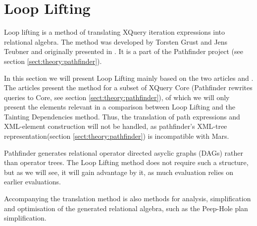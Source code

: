 \section{Loop Lifting}
\label{sect:trans:loop_lifting}
\label{sect:theory:loop_lifting}
Loop lifting is a method of translating XQuery iteration expressions into relational algebra. The method was
developed by Torsten Grust and Jens Teubner and originally presented in \cite{pathfinder_mothertongue}. It is a
part of the Pathfinder project\cite{pathfinderHome} (see section \ref{sect:theory:pathfinder}).

In this section we will present Loop Lifting mainly based on the two articles \cite{pathfinder_mothertongue} and
\cite{pathfinder_purelyRelational}. The articles present the method for a subset of XQuery Core (Pathfinder
rewrites queries to Core, see section \ref{sect:theory:pathfinder}), of which we will only present the elements
relevant in a comparison between Loop Lifting and the Tainting Dependencies method. Thus, the
translation of path expressions and XML-element construction will not be handled, as pathfinder's XML-tree
representation(section \ref{sect:theory:pathfinder}) is incompatible with Mars.

Pathfinder generates relational operator directed asyclic graphs (DAGs) rather than operator trees. The Loop
Lifting method does not require such a structure, but as we will see, it will gain advantage by it, as much
evaluation relies on earlier evaluations. 

Accompanying the translation method is also methods for analysis, simplification and optimisation of the generated
relational algebra, such as the Peep-Hole plan simplification.


